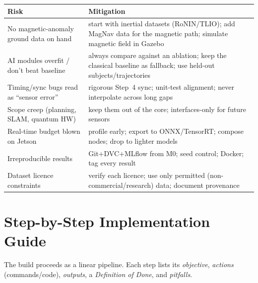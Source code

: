 \documentclass[11pt]{article}
\begin{document}
\begin{center}\footnotesize
\begin{tabular}{@{}p{4.4cm}p{8.0cm}@{}}
\toprule
\textbf{Risk} & \textbf{Mitigation}\\
\midrule
No magnetic-anomaly ground data on hand & start with inertial datasets (RoNIN/TLIO); add MagNav data for the magnetic path; simulate magnetic field in Gazebo\\
AI modules overfit / don't beat baseline & always compare against an ablation; keep the classical baseline as fallback; use held-out subjects/trajectories\\
Timing/sync bugs read as ``sensor error'' & rigorous Step~4 sync; unit-test alignment; never interpolate across long gaps\\
Scope creep (planning, SLAM, quantum HW) & keep them out of the core; interfaces-only for future sensors\\
Real-time budget blown on Jetson & profile early; export to ONNX/TensorRT; compose nodes; drop to lighter models\\
Irreproducible results & Git+DVC+MLflow from M0; seed control; Docker; tag every result\\
Dataset licence constraints & verify each licence; use only permitted (non-commercial/research) data; document provenance\\
\bottomrule
\end{tabular}
\end{center}

\part{Step-by-Step Implementation Guide}

The build proceeds as a linear pipeline. Each step lists its \emph{objective}, \emph{actions}
(commands/code), \emph{outputs}, a \emph{Definition of Done}, and \emph{pitfalls}.
\end{document}
